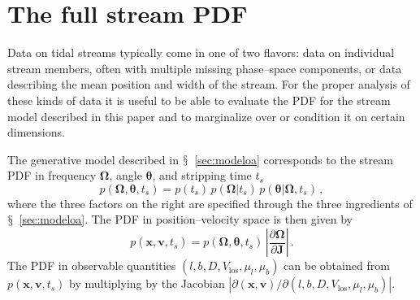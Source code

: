 \documentclass[12pt,preprint]{aastex}
\newcommand{\sectionname}{$\mathsection$}
\renewcommand{\vec}[1]{\ensuremath{\mathbf{#1}}}
\newcommand{\vecx}{\ensuremath{\vec{x}}}
\newcommand{\vecv}{\ensuremath{\vec{v}}}
\newcommand{\vecj}{\ensuremath{\vec{J}}}
\newcommand{\veco}{\ensuremath{\vec{\Omega}}}
\newcommand{\veca}{\ensuremath{\boldsymbol\theta}}
\newcommand{\vlos}{\ensuremath{V_{\mathrm{los}}}}
\newcommand{\pmll}{\ensuremath{\mu_l}}
\newcommand{\pmbb}{\ensuremath{\mu_b}}
\begin{document}
\section{The full stream PDF}\label{sec:pdf}

Data on tidal streams typically come in one of two flavors: data on
individual stream members, often with multiple missing phase--space
components, or data describing the mean position and width of the
stream. For the proper analysis of these kinds of data it is useful to
be able to evaluate the PDF for the stream model described in this
paper and to marginalize over or condition it on certain dimensions.

The generative model described in \sectionname~\ref{sec:modeloa}
corresponds to the stream PDF in frequency $\veco$, angle $\veca$, and
stripping time $t_s$
\begin{equation}
  p(\veco,\veca,t_s) = p(t_s)\,p(\veco|t_s)\,p(\veca|\veco,t_s)\,,
\end{equation}
where the three factors on the right are specified through the three
ingredients of \sectionname~\ref{sec:modeloa}. The PDF in
position--velocity space is then given by
\begin{equation}
  p(\vecx,\vecv,t_s) = p(\veco,\veca,t_s)\,\left|\frac{\partial
    \veco}{\partial \vecj}\right|\,.
\end{equation}
The PDF in observable quantities $(l,b,D,\vlos,\pmll,\pmbb)$ can be
obtained from $p(\vecx,\vecv,t_s)$ by multiplying by the Jacobian
$\left|\partial(\vecx,\vecv)/\partial(l,b,D,\vlos,\pmll,\pmbb)\right|$. 
\end{document}
